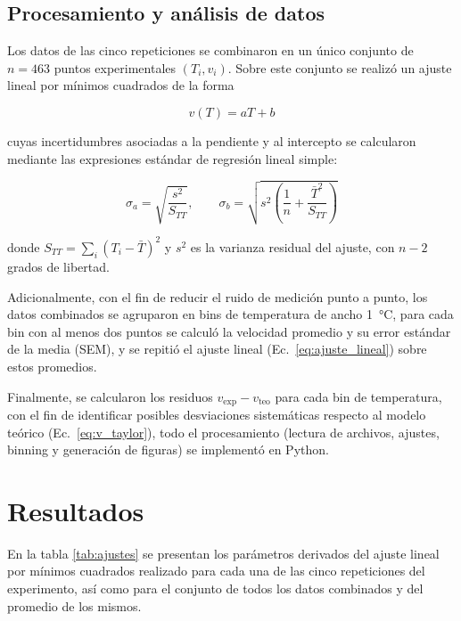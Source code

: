 \documentclass[conference]{IEEEtran}
\begin{document}
\subsection{Procesamiento y análisis de datos}

Los datos de las cinco repeticiones se combinaron en un único conjunto de $n = 463$ puntos experimentales $(T_i, v_i)$. Sobre este conjunto se realizó un ajuste lineal por mínimos cuadrados de la forma

\begin{equation}
v(T) = aT + b
\label{eq:ajuste_lineal}
\end{equation}

\noindent cuyas incertidumbres asociadas a la pendiente y al intercepto se calcularon mediante las expresiones estándar de regresión lineal simple:

\begin{equation*}
\sigma_a = \sqrt{\frac{s^2}{S_{TT}}}, \qquad
\sigma_b = \sqrt{s^2\left(\frac{1}{n}+\frac{\bar{T}^2}{S_{TT}}\right)}
\end{equation*}

\noindent donde $S_{TT} = \sum_i (T_i - \bar{T})^2$ y $s^2$ es la varianza residual del ajuste, con $n-2$ grados de libertad.

Adicionalmente, con el fin de reducir el ruido de medición punto a punto, los datos combinados se agruparon en bins de temperatura de ancho \SI{1}{\celsius}, para cada bin con al menos dos puntos se calculó la velocidad promedio y su error estándar de la media (SEM), y se repitió el ajuste lineal (Ec.~\eqref{eq:ajuste_lineal}) sobre estos promedios.

\noindent Finalmente, se calcularon los residuos $v_{\text{exp}} - v_{\text{teo}}$ para cada bin de temperatura, con el fin de identificar posibles desviaciones sistemáticas respecto al modelo teórico (Ec.~\eqref{eq:v_taylor}), todo el procesamiento (lectura de archivos, ajustes, binning y generación de figuras) se implementó en Python.
\section{Resultados}

En la tabla \ref{tab:ajustes} se presentan los parámetros derivados del ajuste lineal por mínimos cuadrados realizado para cada una de las cinco repeticiones del experimento, así como para el conjunto de todos los datos combinados y del promedio de los mismos. 
\end{document}

